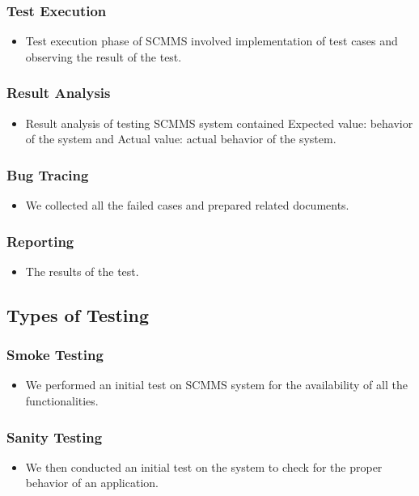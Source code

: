\documentclass[a4paper, 12pt]{report}
\begin{document}
\subsubsection{Test Execution}
\begin{itemize}
    \item Test execution phase of SCMMS involved implementation of test cases and observing the result of the test.
\end{itemize}

\subsubsection{Result Analysis}
\begin{itemize}
    \item Result analysis of testing SCMMS system contained Expected value: behavior of the system and Actual value: actual behavior of the system.
\end{itemize}

\subsubsection{Bug Tracing}
\begin{itemize}
    \item We collected all the failed cases and prepared related documents.
\end{itemize}

\subsubsection{Reporting}
\begin{itemize}
    \item The results of the test.
\end{itemize}
\subsection{Types of Testing}

\subsubsection{Smoke Testing}
\begin{itemize}
    \item We performed an initial test on SCMMS system for the availability of all the functionalities.
\end{itemize}

\subsubsection{Sanity Testing}
\begin{itemize}
    \item We then conducted an initial test on the system to check for the proper behavior of an application.
\end{itemize}
\end{document}
